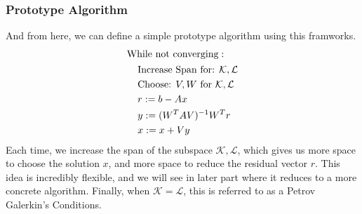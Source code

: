 \documentclass[]{article}
\theoremstyle{definition}
\begin{document}
        \subsubsection{Prototype Algorithm}
            And from here, we can define a simple prototype algorithm using this framworks. 
            \begin{align}
            \begin{aligned}
                & \text{While not converging}: 
                \\&\hspace{1.1em}
                        \begin{aligned}
                        &\text{Increase Span for: } \mathcal{K, L}
                        \\
                        &\text{Choose: } V, W \text{ for } \mathcal{K}, \mathcal{L}
                        \\
                        & r := b - Ax
                        \\
                        & y := (W^TAV)^{-1}W^Tr
                        \\
                        & x := x + Vy
                    \end{aligned}
            \end{aligned}
            \end{align}
            Each time, we increase the span of the subspace $\mathcal K, \mathcal L$, which gives us more space to choose the solution $x$, and more space to reduce the residual vector $r$. This idea is incredibly flexible, and we will see in later part where it reduces to a more concrete algorithm. Finally, when $\mathcal K = \mathcal L$, this is referred to as a Petrov Galerkin's Conditions. 
        
\end{document}

